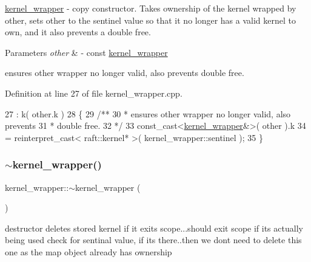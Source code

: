 \hyperlink{classraft_1_1kernel__wrapper}{kernel\+\_\+wrapper} -\/ copy constructor. Takes ownership of the kernel wrapped by other, sets other to the sentinel value so that it no longer has a valid kernel to own, and it also prevents a double free. 
\begin{DoxyParams}{Parameters}
{\em other} & -\/ const \hyperlink{classraft_1_1kernel__wrapper}{kernel\+\_\+wrapper} \\
\hline
\end{DoxyParams}
ensures other wrapper no longer valid, also prevents double free.

Definition at line 27 of file kernel\+\_\+wrapper.\+cpp.


\begin{DoxyCode}
27                                                             : k( other.k )
28 \{\textcolor{comment}{}
29 \textcolor{comment}{    /** }
30 \textcolor{comment}{     * ensures other wrapper no longer valid, also prevents}
31 \textcolor{comment}{     * double free.}
32 \textcolor{comment}{     */}
33     \textcolor{keyword}{const\_cast<}\hyperlink{classraft_1_1kernel__wrapper}{kernel\_wrapper}&\textcolor{keyword}{>}( other ).k 
34         = reinterpret\_cast< raft::kernel* >( kernel\_wrapper::sentinel ); 
35 \}
\end{DoxyCode}
\hypertarget{classraft_1_1kernel__wrapper_a3555642f75df44b60d5cd3f6f2a6b0bd}{}\label{classraft_1_1kernel__wrapper_a3555642f75df44b60d5cd3f6f2a6b0bd} 
\subsubsection{\texorpdfstring{$\sim$kernel\+\_\+wrapper()}{~kernel\_wrapper()}}
{\footnotesize\ttfamily kernel\+\_\+wrapper\+::$\sim$kernel\+\_\+wrapper (\begin{DoxyParamCaption}{ }\end{DoxyParamCaption})\hspace{0.3cm}{\ttfamily [virtual]}}

destructor deletes stored kernel if it exits scope...should exit scope if it\textquotesingle{}s actually being used check for sentinal value, if it\textquotesingle{}s there..then we don\textquotesingle{}t need to delete this one as the map object already has ownership

